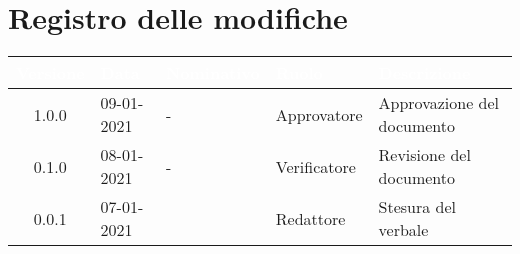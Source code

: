 \section*{Registro delle modifiche}
{

\renewcommand{\arraystretch}{1.5}
\centering
\begin{longtable}{c C{2.6cm}  C{2.6cm} C{2.6cm} C{3.5cm}}
\textcolor{white}{\textbf{Versione}}&
\textcolor{white}{\textbf{Data}}&
\textcolor{white}{\textbf{Nominativo}}&
\textcolor{white}{\textbf{Ruolo}}&
\textcolor{white}{\textbf{Descrizione}}\\	
\endhead

1.0.0 & 09-01-2021 & - & Approvatore & Approvazione del documento\\	
0.1.0 & 08-01-2021 & - & Verificatore & Revisione del documento\\		
0.0.1 & 07-01-2021 & \RA{} & Redattore & Stesura del verbale\\
		
\end{longtable}
}
